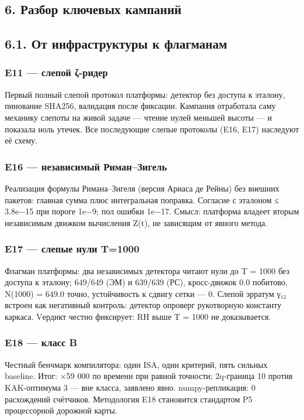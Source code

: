 \documentclass[11pt,a4paper]{article}
\begin{document}
\subsection{6. Разбор ключевых кампаний}

\subsection{6.1. От инфраструктуры к флагманам}

\subsubsection{E11 — слепой ζ-ридер}

Первый полный слепой протокол платформы: детектор без доступа к эталону, пинование SHA256, валидация после фиксации. Кампания отработала саму механику слепоты на живой задаче — чтение нулей меньшей высоты — и показала ноль утечек. Все последующие слепые протоколы (E16, E17) наследуют её схему.

\subsubsection{E16 — независимый Риман–Зигель}

Реализация формулы Римана–Зигеля (версия Ариаса де Рейны) без внешних пакетов: главная сумма плюс интегральная поправка. Согласие с эталоном ≤ 3.8e−15 при пороге 1e−9; пол ошибки 1e−17. Смысл: платформа владеет вторым независимым движком вычисления Z(t), не зависящим от явного метода.

\subsubsection{E17 — слепые нули T=1000}

Флагман платформы: два независимых детектора читают нули до T = 1000 без доступа к эталону; 649/649 (ЭМ) и 639/639 (РС), кросс-движок 0.0 побитово, N(1000) = 649.0 точно, устойчивость к сдвигу сетки — 0. Слепой эрратум γ₁₂ встроен как негативный контроль: детектор опроверг рукотворную константу каркаса. Vердикт честно фиксирует: RH выше T = 1000 не доказывается.

\subsubsection{E18 — класс B}

Честный бенчмарк компилятора: один ISA, один критерий, пять сильных baseline. Итог: ×59 000 по времени при равной точности; 2q-граница 10 против KAK-оптимума 3 — вне класса, заявлено явно. numpy-репликация: 0 расхождений счётчиков. Методология E18 становится стандартом P5 процессорной дорожной карты.
\end{document}
